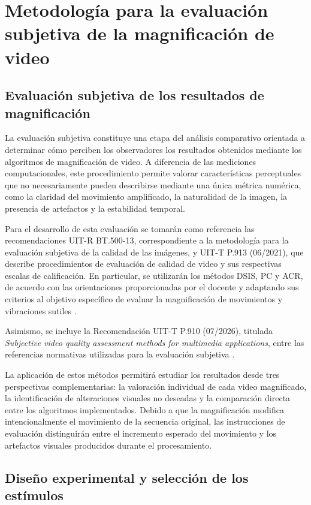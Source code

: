 \section{Metodología para la evaluación subjetiva de la magnificación de video}

\subsection{Evaluación subjetiva de los resultados de magnificación}

La evaluación subjetiva constituye una etapa del análisis comparativo orientada a determinar cómo perciben los observadores los resultados obtenidos mediante los algoritmos de magnificación de video. A diferencia de las mediciones computacionales, este procedimiento permite valorar características perceptuales que no necesariamente pueden describirse mediante una única métrica numérica, como la claridad del movimiento amplificado, la naturalidad de la imagen, la presencia de artefactos y la estabilidad temporal.

Para el desarrollo de esta evaluación se tomarán como referencia las recomendaciones UIT-R BT.500-13, correspondiente a la metodología para la evaluación subjetiva de la calidad de las imágenes, y UIT-T P.913 (06/2021), que describe procedimientos de evaluación de calidad de video y sus respectivas escalas de calificación. En particular, se utilizarán los métodos \gls{DSIS}, \gls{PC} y \gls{ACR}, de acuerdo con las orientaciones proporcionadas por el docente y adaptando sus criterios al objetivo específico de evaluar la magnificación de movimientos y vibraciones sutiles \cite{BT50013,P9132021}.

Asimismo, se incluye la Recomendación UIT-T P.910 (07/2026), titulada \textit{Subjective video quality assessment methods for multimedia applications}, entre las referencias normativas utilizadas para la evaluación subjetiva \cite{P9102026}.

La aplicación de estos métodos permitirá estudiar los resultados desde tres perspectivas complementarias: la valoración individual de cada video magnificado, la identificación de alteraciones visuales no deseadas y la comparación directa entre los algoritmos implementados. Debido a que la magnificación modifica intencionalmente el movimiento de la secuencia original, las instrucciones de evaluación distinguirán entre el incremento esperado del movimiento y los artefactos visuales producidos durante el procesamiento.

\subsection{Diseño experimental y selección de los estímulos}

